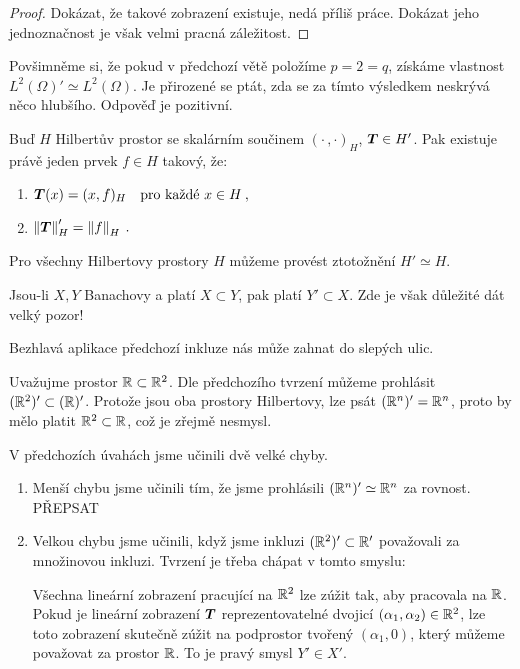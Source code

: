 \begin{proof}
Dokázat, že takové zobrazení existuje, nedá příliš práce. Dokázat jeho jednoznačnost je však velmi pracná záležitost.
\end{proof}

Povšimněme si, že pokud v předchozí větě položíme $p=2=q$, získáme vlastnost $L^2(\Omega)' \simeq L^2(\Omega)$. Je přirozené se ptát, zda se za tímto výsledkem neskrývá něco hlubšího. Odpověď je pozitivní.

\begin{theorem} \label{4.Riesz-Frechet}
Buď $H$ Hilbertův prostor se skalárním součinem $(\cdot \, , \cdot)_H$, $\boldsymbol{T} \in H'$.
Pak existuje právě jeden prvek $f \in H $ takový, že:
\begin{enumerate}
    \item $\boldsymbol{T}(x) = (x,f)_H \quad \text{pro každé } x \in H \:, $
    \item $\left\lVert\boldsymbol{T}\right\rVert_H'= \left\lVert f\right\rVert_H \:.$
\end{enumerate}
\end{theorem}

\begin{corollary}
Pro všechny Hilbertovy prostory $H$ můžeme provést ztotožnění $H' \simeq H$.
\end{corollary}

Jsou-li $X,Y$ Banachovy a platí $X \subset Y$, pak platí $Y' \subset X$. Zde je však důležité dát velký pozor!

\begin{example}
Bezhlavá aplikace předchozí inkluze nás může zahnat do slepých ulic.

Uvažujme prostor $\mathbb{R} \subset \mathbb{R}^2$. Dle předchozího tvrzení můžeme prohlásit $(\mathbb{R}^2)' \subset (\mathbb{R})'$. Protože jsou oba prostory Hilbertovy, lze psát $(\mathbb{R}^n)' = \mathbb{R}^n $, proto by mělo platit $\mathbb{R}^2 \subset \mathbb{R}$, což je zřejmě nesmysl.

V předchozích úvahách jsme učinili dvě velké chyby. \begin{enumerate}
    \item Menší chybu jsme učinili tím, že jsme prohlásili $(\mathbb{R}^n)' \simeq \mathbb{R}^n$ za rovnost. PŘEPSAT
    \item Velkou chybu jsme učinili, když jsme inkluzi $(\mathbb{R}^2)' \subset \mathbb{R}'$ považovali za množinovou inkluzi. Tvrzení je třeba chápat v tomto smyslu:
    
    Všechna lineární zobrazení pracující na $\mathbb{R}^2$ lze zúžit tak, aby pracovala na $\mathbb{R}$. Pokud je lineární zobrazení $\boldsymbol{T}$ reprezentovatelné dvojicí $(\alpha_1, \alpha_2) \in \mathbb{R}^2$, lze toto zobrazení skutečně zúžit na podprostor tvořený $(\alpha_1, 0)$, který můžeme považovat za prostor $\mathbb{R}$. To je pravý smysl  $Y' \in X'$.
\end{enumerate}
\end{example}

